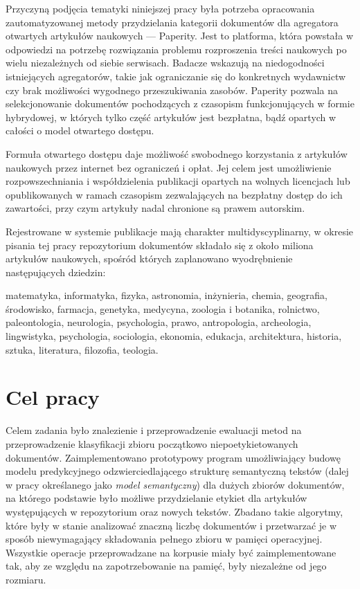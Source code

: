 \documentclass{pracamgr}
\begin{document}
Przyczyną podjęcia tematyki niniejszej pracy była potrzeba opracowania zautomatyzowanej metody przydzielania kategorii dokumentów dla agregatora otwartych artykułów naukowych --- Paperity. Jest to platforma, która powstała w odpowiedzi na potrzebę rozwiązania problemu rozproszenia treści naukowych po wielu niezależnych od siebie serwisach. Badacze wskazują na niedogodności istniejących agregatorów, takie jak ograniczanie się do konkretnych wydawnictw czy brak możliwości wygodnego przeszukiwania zasobów. Paperity pozwala na selekcjonowanie dokumentów pochodzących z czasopism funkcjonujących w formie hybrydowej, w których tylko część artykułów jest bezpłatna, bądź opartych w całości o model otwartego dostępu. 

Formuła otwartego dostępu daje możliwość swobodnego korzystania z artykułów naukowych przez internet bez ograniczeń i opłat. Jej celem jest umożliwienie rozpowszechniania i współdzielenia publikacji opartych na wolnych licencjach lub opublikowanych w ramach czasopism zezwalających na bezpłatny dostęp do ich zawartości, przy czym artykuły nadal chronione są prawem autorskim.

Rejestrowane w systemie publikacje mają charakter multidyscyplinarny, w okresie pisania tej pracy repozytorium dokumentów składało się z około miliona artykułów naukowych, spośród których zaplanowano wyodrębnienie następujących dziedzin:

matematyka, informatyka, fizyka, astronomia, inżynieria, chemia, geografia, środowisko, farmacja, genetyka, medycyna, zoologia i botanika, rolnictwo, paleontologia, neurologia, psychologia, prawo, antropologia, archeologia, lingwistyka, psychologia, sociologia, ekonomia, edukacja, architektura, historia, sztuka, literatura, filozofia, teologia.

\section{Cel pracy}

Celem zadania było znalezienie i przeprowadzenie ewaluacji metod na przeprowadzenie klasyfikacji zbioru początkowo niepoetykietowanych dokumentów. Zaimplementowano prototypowy program umożliwiający budowę modelu predykcyjnego odzwierciedlającego strukturę semantyczną tekstów (dalej w pracy określanego jako \textit{model semantyczny}) dla dużych zbiorów dokumentów, na którego podstawie było możliwe przydzielanie etykiet dla artykułów występujących w repozytorium oraz nowych tekstów. Zbadano takie algorytmy, które były w stanie analizować znaczną liczbę dokumentów i przetwarzać je w sposób niewymagający składowania pełnego zbioru w pamięci operacyjnej. Wszystkie operacje przeprowadzane na korpusie miały być zaimplementowane tak, aby ze względu na zapotrzebowanie na pamięć, były niezależne od jego rozmiaru. 
\end{document}
